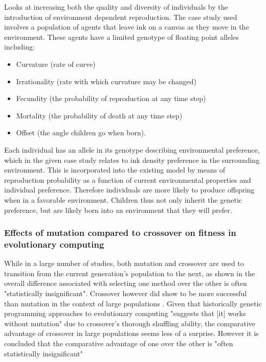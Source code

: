\documentclass[10pt,a4paper]{article}
\begin{document}
	Looks at increasing both the quality and diversity of individuals by the introduction of environment dependent reproduction.
	The case study used involves a population of agents that leave ink on a canvas as they move in the environment.
	These agents have a limited genotype of floating point alleles including: 
	\begin{itemize}
		\item Curvature (rate of curve)
		\item Irrationality (rate with which curvature may be changed)
		\item Fecundity (the probability of reproduction at any time step)
		\item Mortality (the probability of death at any time step)
		\item Offset (the angle children go when born).
	\end{itemize}
	Each individual has an allele in its genotype describing environmental preference, which in the given case study relates to ink density preference in the surrounding environment.
	This is incorporated into the existing model by means of reproduction probability as a function of current environmental properties and individual preference.
	Therefore individuals are more likely to produce offspring when in a favorable environment. 
	Children thus not only inherit the genetic preference, but are likely born into an environment that they will prefer.
	
	\subsubsection{Effects of mutation compared to crossover on fitness in evolutionary computing}
	
	While in a large number of studies, both mutation and crossover are used to transition from the current generation's population to the next, as shown in \citep{mutation-vs-crossover, mutation-vs-crossover-revised} the overall difference associated with selecting one method over the other is often "statistically insignificant".
	Crossover however did show to be more successful than mutation in the context of large populations \citep{mutation-vs-crossover-revised}.
	Given that historically genetic programming approaches to evolutionary computing "suggests that [it] works without mutation" \citep[p.~77]{intro-to-evolutionary-computing} due to crossover's thorough shuffling ability, the comparative advantage of crossover in large populations seems less of a surprise.
	However it is concluded that the comparative advantage of one over the other is "often statistically insignificant" \citep[p.~3]{mutation-vs-crossover-revised} 
	
\end{document}
